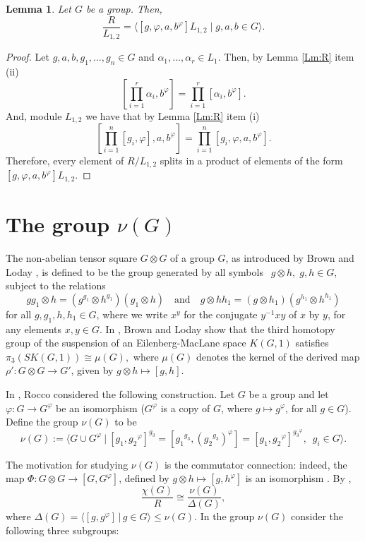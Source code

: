 \documentclass[12pt,leqno]{amsart}
\newtheorem{lem}[theorem]{\sc Lemma}
\begin{document}
\begin{lem}\label{Lm:R/L12} Let $G$ be a group. Then,
    \[
    \frac{R}{L_{1,2}}= \big\langle { [g,\varphi, a,b^{\varphi}]} L_{1,2} \mid g,a,b\in G\big\rangle.
    \]
\end{lem}

\begin{proof}
Let $g,a,b,g_1, \ldots ,g_n\in G$ and $\alpha_1, \ldots ,\alpha_r \in L_1$. Then, by Lemma \ref{Lm:R} item (ii)
\[
\left[ \prod_{i=1}^{r}\alpha_i,b^{\varphi}\right]= \prod_{i=1}^r[\alpha_i,b^{\varphi}].
\]
And, module $L_{1,2}$ we have that by Lemma \ref{Lm:R} item (i)
\[
\left[\prod_{i=1}^n[g_i,\varphi],a,b^{\varphi}\right]=\prod_{i=1}^n\left[g_i,\varphi,a,b^{\varphi}\right].
\]
Therefore, every element of $R/L_{1,2}$ splits in a product of elements of the form $[g,\varphi, a,b^{\varphi}] L_{1,2}$.
\end{proof}

\section{The group \texorpdfstring{$\nu(G)$}{ν(G)}}

The non-abelian tensor square $G \otimes G$ of a group $G$, as introduced by Brown and Loday \cite{BL}, is defined to be the group generated by all symbols $\; \, g\otimes h, \; g,h\in G$, subject to the relations
\[
gg_1 \otimes h = ( g^{g_1}\otimes h^{g_1}) (g_1\otimes h) \quad
\mbox{and} \quad g\otimes hh_1 = (g\otimes h_1)( g^{h_1} \otimes
h^{h_1})
\]
for all $g,g_1, h,h_1 \in G$, where  we write $x^y$ for the conjugate $y^{-1} x y$ of $x$ by $y$, for any elements $x, y \in G$. In \cite{BL}, Brown and Loday show that the third homotopy group of the suspension of an Eilenberg-MacLane space $K(G,1)$ satisfies $\pi_3(SK(G,1)) \cong \mu(G),$ where $\mu(G)$ denotes the kernel of the derived map $\rho': G \otimes G \to G'$, given by  $g \otimes h \mapsto [g,h]$.

In \cite{NR1}, Rocco considered the following construction. Let $G$ be a group and let $\varphi : G \rightarrow G^{\varphi}$ be an isomorphism ($G^{\varphi}$ is a copy of $G$, where $g \mapsto g^{\varphi}$, for all $g \in G$). Define the group $\nu(G)$ to be \[ \nu (G):= \langle 
G \cup G^{\varphi} \ \vert \ [g_1,{g_2}^{\varphi}]^{g_3}=[{g_1}^{g_3},({g_2}^{g_3})^{\varphi}]=[g_1,{g_2}^{\varphi}]^{{g_3}^{\varphi}},
\; \ g_i \in G \rangle .\]

The motivation for studying $\nu(G)$ is the commutator connection: indeed, the map  $\Phi: G \otimes G \rightarrow [G, G^{\varphi}]$, defined by $g \otimes h \mapsto [g , h^{\varphi}]$ is an isomorphism  \cite[Proposition 2.6]{NR1}. By \cite[Remark 4, pags. 1984--1985]{NR2}, \[\frac{\chi(G)}{R} \cong \frac{\nu(G)}{\Delta(G)},\]   where $\Delta(G) = \langle [g,g^{\varphi}]  \, | \, g \in G\rangle \leq \nu(G)$. In the group $\nu(G)$ consider the following three subgroups: 
\end{document}
